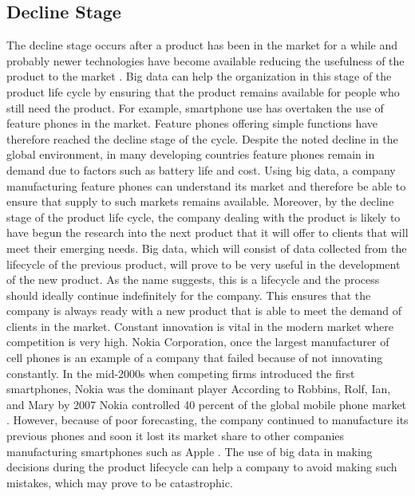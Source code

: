 \documentclass[sigconf]{acmart}
\begin{document}
\subsection{Decline Stage}
The decline stage occurs after a product has been in the market for a while and probably newer technologies have become available reducing the usefulness of the product to the market \cite{Louis2013}. Big data can help the organization in this stage of the product life cycle by ensuring that the product remains available for people who still need the product. For example, smartphone use has overtaken the use of feature phones in the market. Feature phones offering simple functions have therefore reached the decline stage of the cycle. Despite the noted decline in the global environment, in many developing countries feature phones remain in demand due to factors such as battery life and cost. Using big data, a company manufacturing feature phones can understand its market and therefore be able to ensure that supply to such markets remains available. 
Moreover, by the decline stage of the product life cycle, the company dealing with the product is likely to have begun the research into the next product that it will offer to clients that will meet their emerging needs. Big data, which will consist of data collected from the lifecycle of the previous product, will prove to be very useful in the development of the new product. As the name suggests, this is a lifecycle and the process should ideally continue indefinitely for the company. This ensures that the company is always ready with a new product that is able to meet the demand of clients in the market. 
Constant innovation is vital in the modern market where competition is very high. Nokia Corporation, once the largest manufacturer of cell phones is an example of a company that failed because of not innovating constantly. In the mid-2000s when competing firms introduced the first smartphones, Nokia was the dominant player According to Robbins, Rolf, Ian, and Mary by 2007 Nokia controlled 40 percent of the global mobile phone market \cite{Louis2013}. However, because of poor forecasting, the company continued to manufacture its previous phones and soon it lost its market share to other companies manufacturing smartphones such as Apple \cite{Robbins2014}. The use of big data in making decisions during the product lifecycle can help a company to avoid making such mistakes, which may prove to be catastrophic. 
\end{document}

